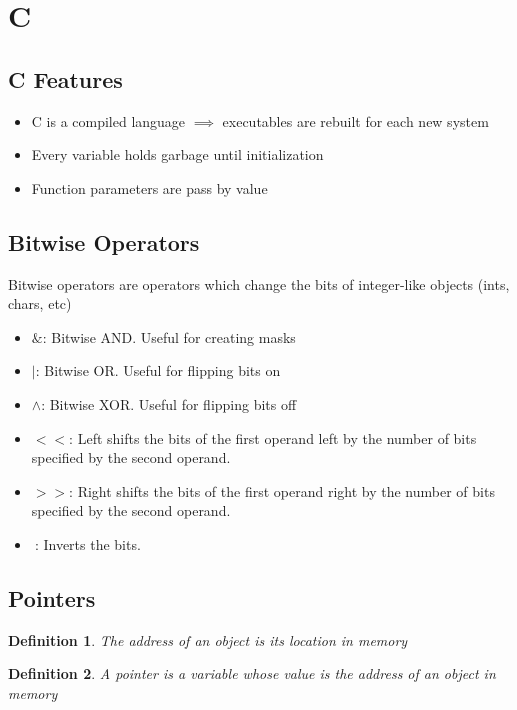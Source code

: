 \documentclass{article}
\newtheorem{definition}{Definition}
\begin{document}
\section{C}
\subsection{C Features}
\begin{itemize}
    \item C is a compiled language $\implies$ executables are rebuilt for each new system
    \item Every variable holds garbage until initialization
    \item Function parameters are pass by value
\end{itemize}
\subsection{Bitwise Operators}
Bitwise operators are operators which change the bits of integer-like objects (ints, chars, etc)
\begin{itemize}
    \item $\&$: Bitwise AND. Useful for creating masks
    \item $|$: Bitwise OR. Useful for flipping bits on
    \item $\wedge$: Bitwise XOR. Useful for flipping bits off
    \item $<<$: Left shifts the bits of the first operand left by the number of bits specified by the second operand.
    \item $>>$: Right shifts the bits of the first operand right by the number of bits specified by the second operand.
    \item $~$: Inverts the bits.
\end{itemize}
\subsection{Pointers}
\begin{definition}
    The address of an object is its location in memory
\end{definition}
\begin{definition}
    A pointer is a variable whose value is the address of an object in memory
\end{definition}
\end{document}
